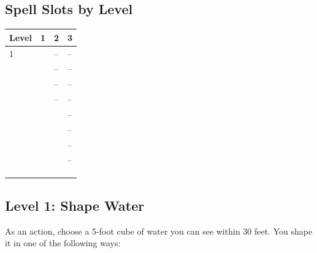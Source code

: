\documentclass[12pt,letterpaper,twocolumn,openany,nodeprecatedcode,bg=none]{dndbook}
\let\oldsubsection\subsection
\renewcommand{\subsection}[1]{%
  \needspace{5\baselineskip}%
  \oldsubsection{#1}%
}
\begin{document}
\subsection{Spell Slots by Level}\label{spell-slots-by-level}


{\def\LTcaptype{none} %
\begin{table}[!htbp]
\centering
\begin{tabular}{@{}
  >{\raggedright\arraybackslash}p{}
  >{\raggedright\arraybackslash}p{}
  >{\raggedright\arraybackslash}p{}
  >{\raggedright\arraybackslash}p{}@{}}
\toprule\noalign{}
\begin{minipage}[b]{\linewidth}\raggedright
Level
\end{minipage} & \begin{minipage}[b]{\linewidth}\raggedright
1
\end{minipage} & \begin{minipage}[b]{\linewidth}\raggedright
2
\end{minipage} & \begin{minipage}[b]{\linewidth}\raggedright
3
\end{minipage} \\
\midrule\noalign{}
1 & 2 & -- & -- \\
2 & 2 & -- & -- \\
3 & 3 & -- & -- \\
4 & 3 & -- & -- \\
5 & 4 & 2 & -- \\
6 & 4 & 2 & -- \\
7 & 4 & 3 & -- \\
8 & 4 & 3 & -- \\
9 & 4 & 3 & 2 \\
10 & 4 & 3 & 2 \\
\bottomrule\noalign{}
\end{tabular}
\end{table}
}

\subsection{Level 1: Shape Water}\label{level-1-shape-water}

As an action, choose a 5-foot cube of water you can see within 30 feet.
You shape it in one of the following ways:
\end{document}
